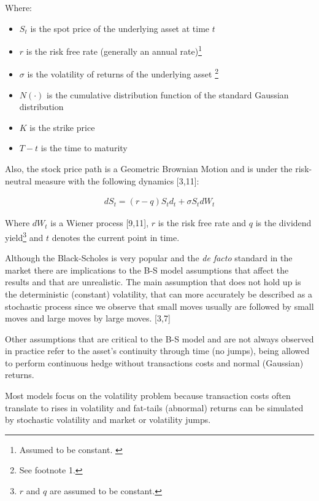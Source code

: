 \documentclass[12pt,twoside]{reedthesis}
\providecommand{\tightlist}{%
  \setlength{\itemsep}{0pt}\setlength{\parskip}{0pt}}
\theoremstyle{definition}
\theoremstyle{definition}
\theoremstyle{remark}
\begin{document}
  \noindent
  Where:
  
  \begin{itemize}
  \tightlist
  \item
    \(S_{t}\) is the spot price of the underlying asset at time \(t\)
  \item
    \(r\) is the risk free rate (generally an annual
    rate)\footnote{Assumed to be constant. \label{teste}}
  \item
    \(\sigma\) is the volatility of returns of the underlying asset
    \footnote{See footnote 1.}
  \item
    \(N(\cdot )\) is the cumulative distribution function of the standard
    Gaussian distribution
  \item
    \(K\) is the strike price
  \item
    \(T-t\) is the time to maturity
  \end{itemize}
  
  \noindent
  Also, the stock price path is a Geometric Brownian Motion and is under
  the risk-neutral measure with the following dynamics {[}3,11{]}:
  
  \begin{align}
  dS_{t} = (r-q)S_td_t+\sigma S_t dW_t
  \end{align}
  
  \noindent
  Where \(dW_t\) is a Wiener process {[}9,11{]}, \(r\) is the risk free
  rate and \(q\) is the dividend
  yield\footnote{$r$ and $q$ are assumed to be constant.} and \(t\)
  denotes the current point in time.
  
  Although the Black-Scholes is very popular and the \emph{de facto}
  standard in the market there are implications to the B-S model
  assumptions that affect the results and that are unrealistic. The main
  assumption that does not hold up is the deterministic (constant)
  volatility, that can more accurately be described as a stochastic
  process since we observe that small moves usually are followed by small
  moves and large moves by large moves. {[}3,7{]}
  
  Other assumptions that are critical to the B-S model and are not always
  observed in practice refer to the asset's continuity through time (no
  jumps), being allowed to perform continuous hedge without transactions
  costs and normal (Gaussian) returns.
  
  Most models focus on the volatility problem because transaction costs
  often translate to rises in volatility and fat-tails (abnormal) returns
  can be simulated by stochastic volatility and market or volatility
  jumps.
  
\end{document}
